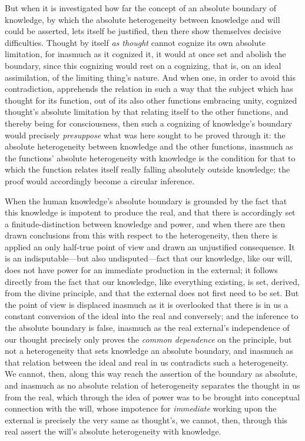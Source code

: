 \documentclass[12pt,a4paper]{book}
\begin{document}
But when it is investigated how far the concept of an absolute boundary of knowledge, by which the
absolute heterogeneity between knowledge and will could be asserted, lets itself be justified, then there
show themselves decisive difficulties. Thought by itself \emph{as thought} cannot cognize its own absolute
limitation, for inasmuch as it cognized it, it would at once set and abolish the boundary, since this
cognizing would rest on a cognizing, that is, on an ideal assimilation, of the limiting thing's nature.
And when one, in order to avoid this contradiction, apprehends the relation in such a way that the
subject which has thought for its function, out of its also other functions embracing unity, cognized
thought's absolute limitation by that relating itself to the other functions, and thereby being for
consciousness, then such a cognizing of knowledge's boundary would precisely \emph{presuppose} what was here
sought to be proved through it: the absolute heterogeneity between knowledge and the other functions,
inasmuch as the functions' absolute heterogeneity with knowledge is the condition for that to which the
function relates itself really falling absolutely outside knowledge; the proof would accordingly become a
circular inference.

When the human knowledge's absolute boundary is grounded by the fact that this knowledge is impotent to
produce the real, and that there is accordingly set a finitude-distinction between knowledge and power,
and when there are then drawn conclusions from this with respect to the heterogeneity, then there is
applied an only half-true point of view and drawn an unjustified consequence. It is an indisputable---but
also undisputed---fact that our knowledge, like our will, does not have power for an immediate production
in the external; it follows directly from the fact that our knowledge, like everything existing, is set,
derived, from the divine principle, and that the external does not first need to be set. But the point of
view is displaced inasmuch as it is overlooked that there is in us a constant conversion of the ideal
into the real and conversely; and the inference to the absolute boundary is false, inasmuch as the real
external's independence of our thought precisely only proves the \emph{common dependence} on the principle,
but not a heterogeneity that sets knowledge an absolute boundary, and inasmuch as that relation between
the ideal and real in us contradicts such a heterogeneity. We cannot, then, along this way reach the
assertion of the boundary as absolute, and inasmuch as no absolute relation of heterogeneity separates
the thought in us from the real, which through the idea of power was to be brought into conceptual
connection with the will, whose impotence for \emph{immediate} working upon the external is precisely the very
same as thought's, we cannot, then, through this real assert the will's absolute heterogeneity with
knowledge.
\end{document}
